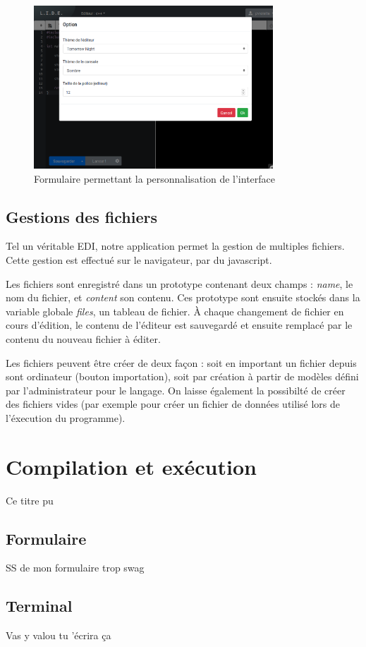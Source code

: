 \begin{figure}[!h]
\centering
\includegraphics[width=0.8\textwidth]{./frontend/example_personnalisation.png}
\caption{Formulaire permettant la personnalisation de l'interface}
\end{figure}

\subsection{Gestions des fichiers}
Tel un véritable EDI, notre application permet la gestion de multiples fichiers. Cette gestion est effectué sur le navigateur, par du javascript.

Les fichiers sont enregistré dans un prototype contenant deux champs : \emph{name}, le nom du fichier, et \emph{content} son contenu. Ces prototype sont ensuite stockés dans la variable
globale \emph{files}, un tableau de fichier. À chaque changement de fichier en cours d'édition, le contenu de l'éditeur est sauvegardé et ensuite remplacé par le contenu du nouveau fichier à éditer.

Les fichiers peuvent être créer de deux façon : soit en important un fichier depuis sont ordinateur (bouton importation), soit par création à partir de modèles défini par l'administrateur pour le langage.
On laisse également la possibilté de créer des fichiers vides (par exemple pour créer un fichier de données utilisé lors de l'éxecution du programme).


\section{Compilation et exécution}
Ce titre pu

\subsection{Formulaire}

SS de mon formulaire trop swag

\subsection{Terminal}

Vas y valou tu 'écrira ça
